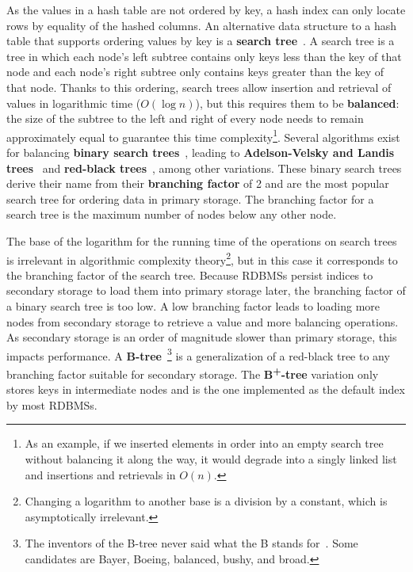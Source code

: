 As the values in a hash table are not ordered by key, a hash index can only locate rows by equality of the hashed columns.
An alternative data structure to a hash table that supports ordering values by key is a \textbf{search tree}~\cite{DBLP:books/daglib/0023376}.
A search tree is a tree in which each node's left subtree contains only keys less than the key of that node and each node's right subtree only contains keys greater than the key of that node.
Thanks to this ordering, search trees allow insertion and retrieval of values in logarithmic time (\(O(\log n)\)), but this requires them to be \textbf{balanced}: the size of the subtree to the left and right of every node needs to remain approximately equal to guarantee this time complexity\footnote{As an example, if we inserted elements in order into an empty search tree without balancing it along the way, it would degrade into a singly linked list and insertions and retrievals in \(O(n)\).}.
Several algorithms exist for balancing \textbf{binary search trees}~\cite{DBLP:books/daglib/0023376}, leading to \textbf{Adelson-Velsky and Landis trees}~\cite{DBLP:books/daglib/0029345} and \textbf{red-black trees}~\cite{DBLP:books/daglib/0023376}, among other variations.
These binary search trees derive their name from their \textbf{branching factor} of 2 and are the most popular search tree for ordering data in primary storage.
The branching factor for a search tree is the maximum number of nodes below any other node.

The base of the logarithm for the running time of the operations on search trees is irrelevant in algorithmic complexity theory\footnote{Changing a logarithm to another base is a division by a constant, which is asymptotically irrelevant.}, but in this case it corresponds to the branching factor of the search tree.
Because RDBMSs persist indices to secondary storage to load them into primary storage later, the branching factor of a binary search tree is too low.
A low branching factor leads to loading more nodes from secondary storage to retrieve a value and more balancing operations.
As secondary storage is an order of magnitude slower than primary storage, this impacts performance.
A \textbf{B-tree}~\cite{DBLP:journals/acta/BayerM72}\footnote{The inventors of the B-tree never said what the B stands for~\cite{DBLP:journals/csur/Comer79}. Some candidates are Bayer, Boeing, balanced, bushy, and broad.} is a generalization of a red-black tree to any branching factor suitable for secondary storage.
The \textbf{B\textsuperscript{+}-tree} variation only stores keys in intermediate nodes and is the one implemented as the default index by most RDBMSs.

